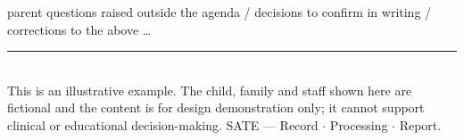 \documentclass[10pt,a4paper]{article}
\begin{document}
\begin{tcolorbox}[colback=white,colframe=gray!30,boxrule=0.4pt,arc=2pt,
  left=8pt,right=8pt,top=6pt,bottom=6pt,boxsep=0pt,height=2.4cm]
\color{gray!45}\scriptsize\sffamily parent questions raised outside the agenda / decisions to confirm in writing / corrections to the above \ldots
\end{tcolorbox}

\vfill
{\color{accentlt}\rule{\linewidth}{0.6pt}}\\[1pt]
{\scriptsize\color{black!55}\sffamily This is an illustrative example. The child, family and staff shown
here are fictional and the content is for design demonstration only; it cannot support clinical or
educational decision-making. SATE --- Record $\cdot$ Processing $\cdot$ Report.}
\end{document}
